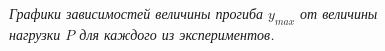 \documentclass[a4paper,12pt]{report}
\begin{document}
\begin{figure}[]
\caption{\textit{Графики зависимостей величины прогиба $y_{max}$ от величины нагрузки $P$ для каждого из экспериментов.}}
\end{figure}
\end{document}
